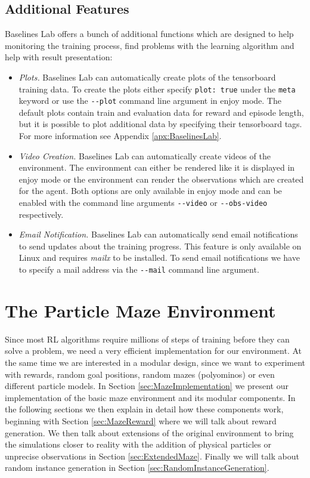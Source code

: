 \subsection{Additional Features} \label{sec:blAdvanced}
Baselines Lab offers a bunch of additional functions which are designed to help monitoring the training process, find problems with the learning algorithm and help with result presentation:

\begin{itemize}
    \item \textit{Plots.} Baselines Lab can automatically create plots of the tensorboard training data. To create the plots either specify \texttt{plot: true} under the \texttt{meta} keyword or use the \texttt{-{}-plot} command line argument in enjoy mode. The default plots contain train and evaluation data for reward and episode length, but it is possible to plot additional data by specifying their tensorboard tags. For more information see Appendix \ref{apx:BaselinesLab}.
    \item \textit{Video Creation.} Baselines Lab can automatically create videos of  the environment. The environment can either be rendered like it is displayed in enjoy mode or the environment can render the observations which are created for the agent. Both options are only available in enjoy mode and can be enabled with the command line arguments \texttt{-{}-video} or \texttt{-{}-obs-video} respectively.
    \item \textit{Email Notification.} Baselines Lab can automatically send email notifications to send updates about the training progress. This feature is only available on Linux and requires \textit{mailx} to be installed. To send email notifications we have to specify a mail address via the \texttt{-{}-mail} command line argument. 
\end{itemize}

\section{The Particle Maze Environment} \label{sec:MazeEnvironment}
Since most RL algorithms require millions of steps of training before they can solve a problem, we need a very efficient implementation for our environment. At the same time we are interested in a modular design, since we want to experiment with rewards, random goal positions, random mazes (polyominos) or even different particle models. In Section \ref{sec:MazeImplementation} we present our implementation of the basic maze environment and its modular components. In the following sections we then explain in detail how these components work, beginning with Section \ref{sec:MazeReward} where we will talk about reward generation. We then talk about extensions of the original environment to bring the simulations closer to reality with the addition of physical particles or unprecise observations in Section \ref{sec:ExtendedMaze}. Finally we will talk about random instance generation in Section \ref{sec:RandomInstanceGeneration}.


